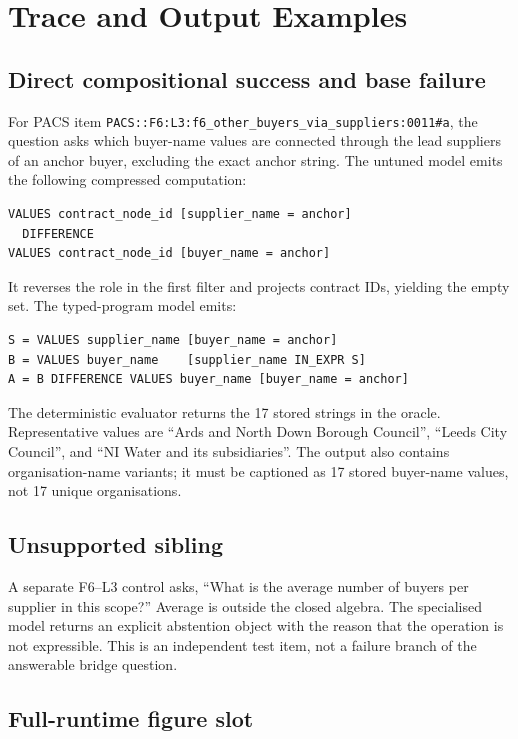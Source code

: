 \section{Trace and Output Examples}
\label{app:examples}

\subsection{Direct compositional success and base failure}

For PACS item \texttt{PACS::F6:L3:f6\_other\_buyers\_via\_suppliers:0011\#a}, the question asks
which buyer-name values are connected through the lead suppliers of an anchor buyer, excluding
the exact anchor string.  The untuned model emits the following compressed computation:
\begin{verbatim}
VALUES contract_node_id [supplier_name = anchor]
  DIFFERENCE
VALUES contract_node_id [buyer_name = anchor]
\end{verbatim}
It reverses the role in the first filter and projects contract IDs, yielding the empty set.  The
typed-program model emits:
\begin{verbatim}
S = VALUES supplier_name [buyer_name = anchor]
B = VALUES buyer_name    [supplier_name IN_EXPR S]
A = B DIFFERENCE VALUES buyer_name [buyer_name = anchor]
\end{verbatim}
The deterministic evaluator returns the 17 stored strings in the oracle.  Representative values
are ``Ards and North Down Borough Council'', ``Leeds City Council'', and ``NI Water and its
subsidiaries''.  The output also contains organisation-name variants; it must be captioned as 17
stored buyer-name values, not 17 unique organisations.

\subsection{Unsupported sibling}

A separate F6--L3 control asks, ``What is the average number of buyers per supplier in this
scope?''  Average is outside the closed algebra.  The specialised model returns an explicit
abstention object with the reason that the operation is not expressible.  This is an independent
test item, not a failure branch of the answerable bridge question.

\subsection{Full-runtime figure slot}

